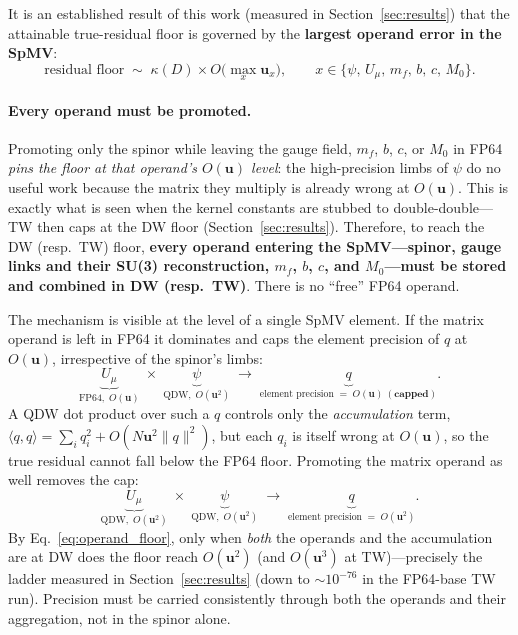 \documentclass[12pt,a4paper]{article}
\newcommand{\uu}{\mathbf{u}}
\begin{document}
It is an established result of this work (measured in Section~\ref{sec:results})
that the attainable true-residual floor is governed by the \textbf{largest
operand error in the SpMV}:
\begin{equation}
  \text{residual floor} \;\sim\; \kappa(D)\times O\!\bigl(\max_x \uu_x\bigr),
  \qquad x \in \{\psi,\,U_\mu,\,m_f,\,b,\,c,\,M_0\}.
  \label{eq:operand_floor}
\end{equation}

\paragraph{Every operand must be promoted.}
Promoting only the spinor while leaving the gauge field, $m_f$, $b$, $c$, or
$M_0$ in FP64 \emph{pins the floor at that operand's $O(\uu)$ level}: the
high-precision limbs of $\psi$ do no useful work because the matrix they
multiply is already wrong at $O(\uu)$. This is exactly what is seen when the
kernel constants are stubbed to double-double---TW then caps at the DW floor
(Section~\ref{sec:results}). Therefore, to reach the DW (resp.\ TW) floor,
\textbf{every operand entering the SpMV---spinor, gauge links and their SU(3)
reconstruction, $m_f$, $b$, $c$, and $M_0$---must be stored and combined in DW
(resp.\ TW)}. There is no ``free'' FP64 operand.

The mechanism is visible at the level of a single SpMV element. If the matrix
operand is left in FP64 it dominates and caps the element precision of $q$ at
$O(\uu)$, irrespective of the spinor's limbs:
\begin{equation}
  \underbrace{U_\mu}_{\text{FP64},\; O(\uu)}
  \;\times\;
  \underbrace{\psi}_{\text{QDW},\; O(\uu^2)}
  \;\longrightarrow\;
  \underbrace{q}_{\text{element precision} \;=\; O(\uu)\ (\textbf{capped})}.
\end{equation}
A QDW dot product over such a $q$ controls only the \emph{accumulation} term,
$\langle q,q\rangle = \sum_i q_i^2 + O(N\uu^2\|q\|^2)$, but each $q_i$ is itself
wrong at $O(\uu)$, so the true residual cannot fall below the FP64 floor.
Promoting the matrix operand as well removes the cap:
\begin{equation}
  \underbrace{U_\mu}_{\text{QDW},\; O(\uu^2)}
  \;\times\;
  \underbrace{\psi}_{\text{QDW},\; O(\uu^2)}
  \;\longrightarrow\;
  \underbrace{q}_{\text{element precision} \;=\; O(\uu^2)}.
\end{equation}
By Eq.~\eqref{eq:operand_floor}, only when \emph{both} the operands and the
accumulation are at DW does the floor reach $O(\uu^2)$ (and $O(\uu^3)$ at
TW)---precisely the ladder measured in Section~\ref{sec:results} (down to
$\sim\!10^{-76}$ in the FP64-base TW run). Precision must be carried
consistently through both the operands and their aggregation, not in the spinor
alone.
\end{document}
